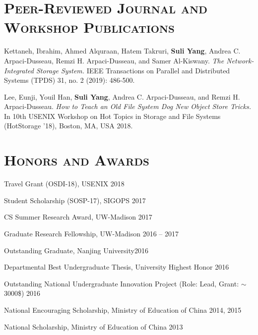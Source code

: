 \documentclass[10pt, letterpaper]{article}
\renewenvironment{itemize}{
  \begin{list}{}{
    \setlength{\leftmargin}{1.2em}
    \setlength{\itemsep}{0.12em}
    \setlength{\parskip}{0pt}
    \setlength{\parsep}{0.12em}
  }
}{
  \end{list}
}
\begin{document}
\section*{\textsc{Peer-Reviewed Journal and Workshop Publications}}

\begin{enumerate}[fullwidth,itemindent=1em,label={[\arabic*]}]
      \item Kettaneh, Ibrahim, Ahmed Alquraan, Hatem Takruri, {\bf Suli Yang}, Andrea C. Arpaci-Dusseau, Remzi H. Arpaci-Dusseau, and Samer Al-Kiswany. \textit{The Network-Integrated Storage System.} 
      IEEE Transactions on Parallel and Distributed Systems (TPDS) 31, no. 2 (2019): 486-500.

       \item Lee, Eunji, Youil Han, {\bf Suli Yang}, Andrea C. Arpaci-Dusseau, and Remzi H. Arpaci-Dusseau. \textit{How to Teach an Old File System Dog New Object Store Tricks.} 
        In 10th {USENIX} Workshop on Hot Topics in Storage and File Systems (HotStorage '18), Boston, MA, USA 2018.
	
\end{enumerate}

\section*{\textsc{Honors and Awards}}
\begin{itemize}
  \item Travel Grant (OSDI-18), USENIX \hfill 2018
  \item Student Scholarship (SOSP-17), SIGOPS \hfill 2017
  \item CS Summer Research Award, UW-Madison \hfill 2017
  \item Graduate Research Fellowship, UW-Madison \hfill 2016 -- 2017
  \item Outstanding Graduate, Nanjing University\hfill 2016
  \item Departmental Best Undergraduate Thesis, University Highest Honor \hfill 2016
  \item Outstanding National Undergraduate Innovation Project (Role: Lead, Grant: $\sim$3000\$)  \hfill 2016
  \item National Encouraging Scholarship, Ministry of Education of China \hfill 2014, 2015
  \item National Scholarship, Ministry of Education of China \hfill 2013
\end{itemize}
\fi
\end{document}
